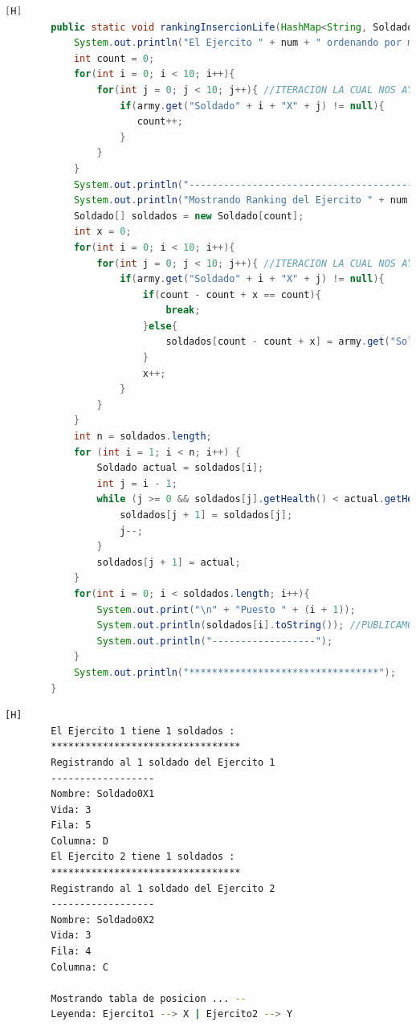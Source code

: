 \documentclass{article}
\begin{document}
	\begin{lstlisting}[language=java,caption={Las lineas de codigos del metodo creado:}][H]
		public static void rankingInsercionLife(HashMap<String, Soldado> army , int num){
			System.out.println("El Ejercito " + num + " ordenando por metodo insercion: ");
			int count = 0;
			for(int i = 0; i < 10; i++){
				for(int j = 0; j < 10; j++){ //ITERACION LA CUAL NOS AYUDA A PASAR POR TODOS LOS SOLDADOS DE CADA EJERCITO
					if(army.get("Soldado" + i + "X" + j) != null){ 
					   count++;
					}
				}
			}
			System.out.println("------------------------------------------");
			System.out.println("Mostrando Ranking del Ejercito " + num + " ..... ////// --->");
			Soldado[] soldados = new Soldado[count];
			int x = 0;
			for(int i = 0; i < 10; i++){
				for(int j = 0; j < 10; j++){ //ITERACION LA CUAL NOS AYUDA A PASAR POR TODOS LOS SOLDADOS AL ARRAY SOLDADO PARA PODER USAR EL USO DEL METODO DE ORDENACION INSERCION
					if(army.get("Soldado" + i + "X" + j) != null){ 
						if(count - count + x == count){
							break;
						}else{
							soldados[count - count + x] = army.get("Soldado" + i + "X" + j); //LA MISMA LOGICA QUE EL ANTERIOR METODO SOLO QUE EN ESTE LO USARIAMOS DE MANERA DIFERENTE YA QUE ESTE SERIA DE FORMA DE INSERCION
						}
						x++;   
					}
				}
			}
			int n = soldados.length;
			for (int i = 1; i < n; i++) {
				Soldado actual = soldados[i];
				int j = i - 1;
				while (j >= 0 && soldados[j].getHealth() < actual.getHealth()) { //ORDENAMOS EL EJERCITO RESPECTIVAMENTE MEDIANTE EL METODO QUE NOS OFRECE INSERCION EL CUAL ES ESTE CODIGO
					soldados[j + 1] = soldados[j];
					j--;
				}
				soldados[j + 1] = actual;
			}
			for(int i = 0; i < soldados.length; i++){
				System.out.print("\n" + "Puesto " + (i + 1));
				System.out.println(soldados[i].toString()); //PUBLICAMOS RESULTADOS
				System.out.println("------------------");
			}
			System.out.println("*********************************");
		}
	\end{lstlisting}
	\begin{lstlisting}[language=bash,caption={Ejecucion:}][H]
		El Ejercito 1 tiene 1 soldados : 
		*********************************
		Registrando al 1 soldado del Ejercito 1
		------------------
		Nombre: Soldado0X1
		Vida: 3
		Fila: 5
		Columna: D
		El Ejercito 2 tiene 1 soldados : 
		*********************************
		Registrando al 1 soldado del Ejercito 2
		------------------
		Nombre: Soldado0X2
		Vida: 3
		Fila: 4
		Columna: C

		Mostrando tabla de posicion ... --
		Leyenda: Ejercito1 --> X | Ejercito2 --> Y

	\end{lstlisting}
\end{document}
